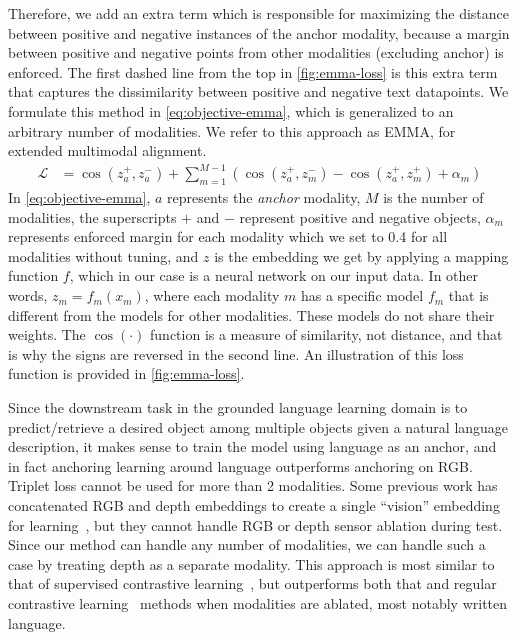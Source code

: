 \documentclass[sigconf,natbib=true,anonymous=true]{acmart}
\begin{document}
Therefore, we add an extra term which is responsible for maximizing the distance between positive and negative instances of the anchor modality, because a margin between positive and negative points from other modalities (excluding anchor) is enforced. 
The first dashed line from the top in \cref{fig:emma-loss} is this extra term that captures the dissimilarity between positive and negative text datapoints.
We formulate this method in \cref{eq:objective-emma}, which is generalized to an arbitrary number of modalities. We refer to this approach as EMMA, for extended multimodal alignment.
\begin{equation}
\label{eq:objective-emma}
\begin{split}
    \mathcal{L}  %
    &= \cos(z_{a}^{+}, z_{a}^{-}) + \sum_{m=1}^{M-1} \left(\cos(z_{a}^{+} ,z_{m}^{-}) - \cos(z_{a}^{+}, z_{m}^{+}) + \alpha_m\right) 
\end{split}
\end{equation}
In \cref{eq:objective-emma}, $a$ represents the \textit{anchor} modality, $M$ is the number of modalities, the superscripts $+$ and $-$ represent positive and negative objects, $\alpha_m$ represents enforced margin for each modality which we set to 0.4 for all modalities without tuning, and $z$ is the embedding we get by applying a mapping function $f$, which in our case is a neural network on our input data.
In other words, $z_m = f_m(x_m)$, where each modality $m$ has a specific model $f_m$ that is different from the models for other modalities. These models do not share their weights. The $\cos(\cdot)$ function is a measure of similarity, not distance, and that is why the signs are reversed in the second line. An illustration of this loss function is provided in \cref{fig:emma-loss}.

Since the downstream task in the grounded language learning domain is to predict/retrieve a desired object among multiple objects given a natural language description, it makes sense to train the model using language as an anchor, and in fact anchoring learning around language outperforms anchoring on RGB. Triplet loss cannot be used for more than 2 modalities. Some previous work has concatenated RGB and depth embeddings to create a single ``vision'' embedding for learning~\cite{triplet_loss_2021_CVPR}, but they cannot handle RGB or depth sensor ablation during test. Since our method can handle any number of modalities, we can handle such a case by treating depth as a separate modality.
This approach is most similar to that of supervised contrastive learning~\cite{NEURIPS2020_supervised_contrastive}, but outperforms both that and regular contrastive learning~\cite{chen2020simple} methods when modalities are ablated, most notably written language.
\end{document}
